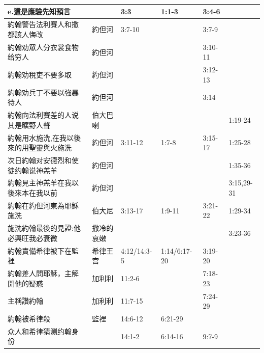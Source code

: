 \begin{table}[H]
\begin{tabular}{p{}|l|l|l|l|l}
 \multicolumn{1}{p{13.43em}|}{e.這是應驗先知預言} & \multicolumn{1}{r|}{} & \multicolumn{1}{l|}{3:3} &\multicolumn{1}{l|}{1:1-3} &\multicolumn{1}{l|}{3:4-6} &  \\\midrule

    \multicolumn{1}{p{20.075em}|}{約翰警告法利賽人和撒都該人悔改} & 約但河   & 3:7-10 & \multicolumn{1}{r|}{} & 3:7-9&  \\ \midrule

 \multicolumn{1}{p{20.075em}|}{約翰劝眾人分衣裳食物给穷人} & 約但河   &  & \multicolumn{1}{r|}{} & 3:10-11 &  \\ \midrule
\multicolumn{1}{p{20.075em}|}{約翰劝稅吏不要多取} & 約但河   &  & \multicolumn{1}{r|}{} & 3:12-13&  \\ \midrule
\multicolumn{1}{p{20.075em}|}{約翰劝兵丁不要以強暴待人} & 約但河   &  & \multicolumn{1}{r|}{} & 3:14&  \\ \midrule
\multicolumn{1}{p{20.075em}|}{約翰向法利賽差的人说其是曠野人聲} & 伯大巴喇   & & &  & 1:19-24 \\  \midrule

\multicolumn{1}{p{20.075em}|}{約翰用水施洗,在我以後來的用聖靈與火施洗} & 約但河   & 3:11-12 & 1:7-8 & 3:15-17 & 1:25-28\\  \midrule

\multicolumn{1}{p{20.75em}|}{次日約翰对安德烈和使徒约翰说神羔羊} & 約但河   &&& &1:35-36\\  \midrule

\multicolumn{1}{p{20.75em}|}{約翰見主神羔羊在我以後來本在我以前} & 約但河   &&& &3:15,29-31\\  \midrule

約翰在約但河東為耶穌施洗&伯大尼&3:13-17&1:9-11&3:21-22&1:29-34 \\\midrule
\multicolumn{1}{p{20.5em}|}{施洗約翰最後的見證:他必興旺我必衰微} & \multicolumn{1}{p{5.355em}|}{撒冷的哀嫩} &       &       &       & 3:23-36 \\ \midrule

約翰責備希律被下在監裡&希律王宫&4:12/14:3-5&1:14/6:17-20&3:19-20&\\\midrule
約翰差人問耶穌，主解開他的疑惑&加利利&11:2-6&&7:18-23&\\\midrule
主稱讚約翰&加利利&11:7-15&&7:24-29&\\\midrule

約翰被希律殺&監裡&14:6-12&6:21-29&&\\ \bottomrule
众人和希律猜测约翰身份&&14:1-2&6:14-16&9:7-9&\\ \bottomrule
\end{tabular}%
\end{table}%


